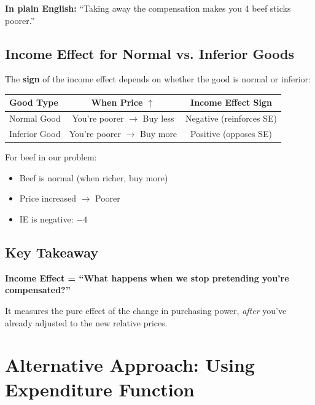 \documentclass[11pt]{article}
\begin{document}
\textbf{In plain English:} ``Taking away the compensation makes you 4 beef sticks poorer.''

\subsection{Income Effect for Normal vs. Inferior Goods}

The \textbf{sign} of the income effect depends on whether the good is normal or inferior:

\begin{center}
\begin{tabular}{|l|c|c|}
\hline
\textbf{Good Type} & \textbf{When Price $\uparrow$} & \textbf{Income Effect Sign} \\
\hline
Normal Good & You're poorer $\to$ Buy less & Negative (reinforces SE) \\
Inferior Good & You're poorer $\to$ Buy more & Positive (opposes SE) \\
\hline
\end{tabular}
\end{center}

For beef in our problem:
\begin{itemize}
    \item Beef is normal (when richer, buy more)
    \item Price increased $\to$ Poorer
    \item IE is negative: $-4$
\end{itemize}

\subsection{Key Takeaway}

\begin{center}
\colorbox{yellow!30}{
\begin{minipage}{0.9\textwidth}
\textbf{Income Effect = ``What happens when we stop pretending you're compensated?''}

It measures the pure effect of the change in purchasing power, \textit{after} you've already adjusted to the new relative prices.
\end{minipage}
}
\end{center}

\section{Alternative Approach: Using Expenditure Function}
\end{document}
